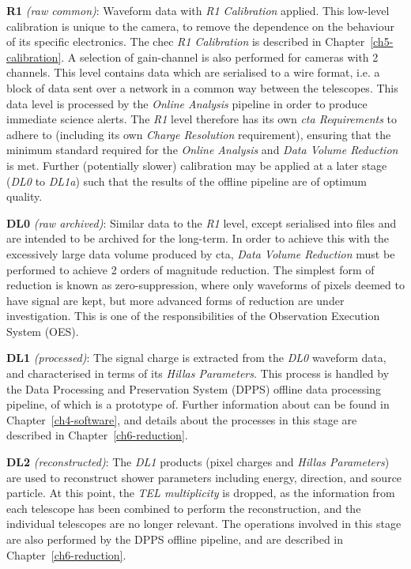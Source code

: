 \textbf{R1} \textit{(raw common)}:
Waveform data with \textit{R1 Calibration} applied. This low-level calibration is unique to the camera, to remove the dependence on the behaviour of its specific electronics. The \gls{chec} \textit{R1 Calibration} is described in Chapter~\ref{ch5-calibration}. A selection of gain-channel is also performed for cameras with 2 channels. This level contains data which are serialised to a wire format, i.e. a block of data sent over a network in a common way between the telescopes. This data level is processed by the \textit{Online Analysis} pipeline in order to produce immediate science alerts. The \textit{R1} level therefore has its own \textit{\gls{cta} Requirements} to adhere to (including its own \textit{Charge Resolution} requirement), ensuring that the minimum standard required for the \textit{Online Analysis} and \textit{Data Volume Reduction} is met. Further (potentially slower) calibration may be applied at a later stage (\textit{DL0} to \textit{DL1a}) such that the results of the offline pipeline are of optimum quality.

\textbf{DL0} \textit{(raw archived)}: Similar data to the \textit{R1} level, except serialised into files and are intended to be archived for the long-term. In order to achieve this with the excessively large data volume produced by \gls{cta}, \textit{Data Volume Reduction} must be performed to achieve 2 orders of magnitude reduction. The simplest form of reduction is known as zero-suppression, where only waveforms of pixels deemed to have signal are kept, but more advanced forms of reduction are under investigation. This is one of the responsibilities of the Observation Execution System (OES).

\textbf{DL1} \textit{(processed)}: The signal charge is extracted from the \textit{DL0} waveform data, and characterised in terms of its \textit{Hillas Parameters}. This process is handled by the Data Processing and Preservation System (DPPS) offline data processing pipeline, of which  is a prototype of. Further information about  can be found in Chapter~\ref{ch4-software}, and details about the processes in this stage are described in Chapter~\ref{ch6-reduction}.

\textbf{DL2} \textit{(reconstructed)}: The \textit{DL1} products (pixel charges and \textit{Hillas Parameters}) are used to reconstruct shower parameters including energy, direction, and source particle. At this point, the \textit{TEL multiplicity} is dropped, as the information from each telescope has been combined to perform the reconstruction, and the individual telescopes are no longer relevant. The operations involved in this stage are also performed by the DPPS offline pipeline, and are described in Chapter~\ref{ch6-reduction}.

